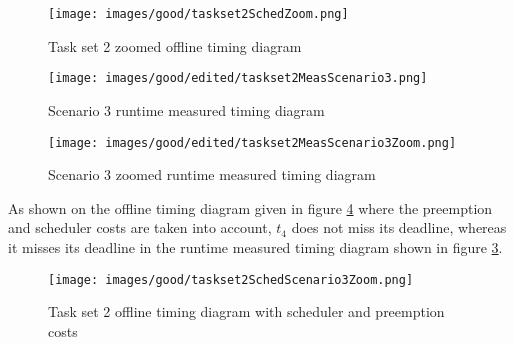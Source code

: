 \documentclass[conference,compsocconf]{IEEEtran}
\begin{document}
\begin{center}
\begin{figure}[!h]
\texttt{[image: images/good/taskset2SchedZoom.png]}
  \caption{ Task set 2 zoomed offline timing diagram}
\label{taskSet2SchedZoom}
\end{figure}
\end{center}



\begin{center}
\begin{figure}[!h]
\texttt{[image: images/good/edited/taskset2MeasScenario3.png]}
  \caption{ Scenario 3 runtime measured timing diagram}
\label{scenario3Meas}
\end{figure}
\end{center}




\begin{center}
\begin{figure}[!h]
\texttt{[image: images/good/edited/taskset2MeasScenario3Zoom.png]}
  \caption{ Scenario 3 zoomed runtime measured timing diagram}
\label{scenario3MeasZoom}
\end{figure}
\end{center}

As shown on the offline timing diagram given in figure \ref{taskSet2SchedZoom} where the preemption and scheduler costs are taken into account, $t_4$ does not miss its deadline, whereas it misses its deadline in the runtime measured timing diagram shown in figure \ref{scenario3MeasZoom}. 



\begin{center}
\begin{figure}[!h]
\texttt{[image: images/good/taskset2SchedScenario3Zoom.png]}
  \caption{ Task set 2 offline timing diagram with scheduler and preemption costs}
\label{taskSet2SchedZoom}
\end{figure}
\end{center}

\end{document}
